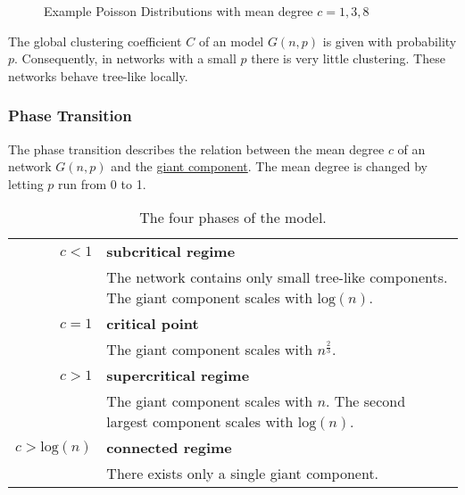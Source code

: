 \documentclass[english]{panikzettel}
\begin{document}
\begin{figure}[ht!]
	\centering
	\caption{Example Poisson Distributions with mean degree $ c = 1,3,8 $}
	\label{fig:example_poisson}
\end{figure}

The global clustering coefficient $ C $ of an \erdosrenyi model $ G(n,p) $ is given with probability $ p $.
Consequently, in networks with a small $ p $ there is very little clustering.
These networks behave tree-like locally.

\subsubsection{Phase Transition}
The phase transition describes the relation between the mean degree $ c $ of an \erdosrenyi network $ G(n,p) $ and the \hyperref[sec:components]{giant component}. The mean degree is changed by letting $ p $ run from 0 to 1.

\begin{table}[ht!]
	\centering
	\begin{tabular}{|r|p{12cm}|}
		\hline
		$ c < 1 $ & \textbf{subcritical regime} \\
		& The network contains only small tree-like components. The giant component scales with $ \text{log}(n) $. \\
		\hline
		$ c = 1 $ & \textbf{critical point} \\
		& The giant component scales with $ n^\frac{2}{3} $. \\
		\hline
		$ c > 1 $ & \textbf{supercritical regime} \\
		& The giant component scales with $ n $. The second largest component scales with $ \text{log}(n) $. \\
		\hline
		$ c > \text{log}(n) $ & \textbf{connected regime} \\
		& There exists only a single giant component. \\
		\hline
	\end{tabular}
	\caption{The four phases of the \erdosrenyi model.}
	\label{tab:phase_transition}
\end{table}
\end{document}
